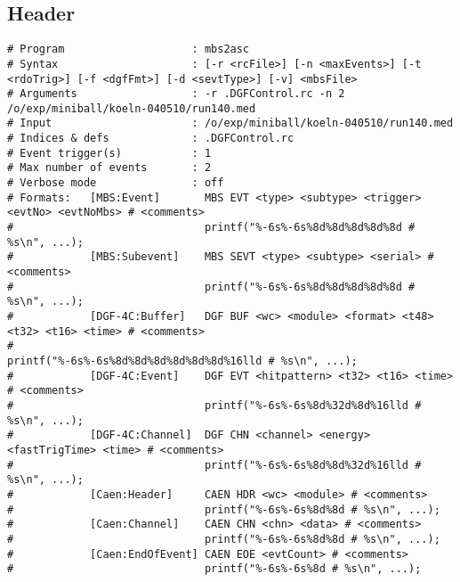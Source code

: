 \documentclass[12pt]{article}
\begin{document}
\subsection{Header}
\begin{scriptsize}
\verb+# Program                    : mbs2asc+\\
\verb+# Syntax                     : [-r <rcFile>] [-n <maxEvents>] [-t <rdoTrig>] [-f <dgfFmt>] [-d <sevtType>] [-v] <mbsFile>+\\
\verb+# Arguments                  : -r .DGFControl.rc -n 2 /o/exp/miniball/koeln-040510/run140.med+\\
\verb+# Input                      : /o/exp/miniball/koeln-040510/run140.med+\\
\verb+# Indices & defs             : .DGFControl.rc+\\
\verb+# Event trigger(s)           : 1+\\
\verb+# Max number of events       : 2+\\
\verb+# Verbose mode               : off+\\
\verb+# Formats:   [MBS:Event]       MBS EVT <type> <subtype> <trigger> <evtNo> <evtNoMbs> # <comments>+\\
\verb+#                              printf("%-6s%-6s%8d%8d%8d%8d%8d # %s\n", ...);+\\
\verb+#            [MBS:Subevent]    MBS SEVT <type> <subtype> <serial> # <comments>+\\
\verb+#                              printf("%-6s%-6s%8d%8d%8d%8d%8d # %s\n", ...);+\\
\verb+#            [DGF-4C:Buffer]   DGF BUF <wc> <module> <format> <t48> <t32> <t16> <time> # <comments>+\\
\verb+#                              printf("%-6s%-6s%8d%8d%8d%8d%8d%8d%16lld # %s\n", ...);+\\
\verb+#            [DGF-4C:Event]    DGF EVT <hitpattern> <t32> <t16> <time> # <comments>+\\
\verb+#                              printf("%-6s%-6s%8d%32d%8d%16lld # %s\n", ...);+\\
\verb+#            [DGF-4C:Channel]  DGF CHN <channel> <energy> <fastTrigTime> <time> # <comments>+\\
\verb+#                              printf("%-6s%-6s%8d%8d%32d%16lld # %s\n", ...);+\\
\verb+#            [Caen:Header]     CAEN HDR <wc> <module> # <comments>+\\
\verb+#                              printf("%-6s%-6s%8d%8d # %s\n", ...);+\\
\verb+#            [Caen:Channel]    CAEN CHN <chn> <data> # <comments>+\\
\verb+#                              printf("%-6s%-6s%8d%8d # %s\n", ...);+\\
\verb+#            [Caen:EndOfEvent] CAEN EOE <evtCount> # <comments>+\\
\verb+#                              printf("%-6s%-6s%8d # %s\n", ...);+\\
\end{scriptsize}
\end{document}
